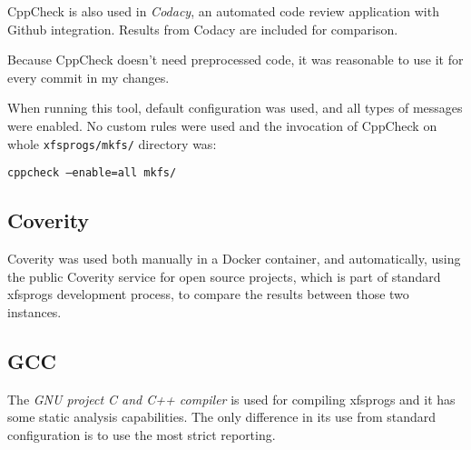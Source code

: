 CppCheck is also used in {\em Codacy}, an automated code review application
with Github integration. Results from Codacy are included for comparison.

Because CppCheck doesn't need preprocessed code, it was reasonable to use
it for every commit in my changes.

When running this tool, default configuration was used, and all types of
messages were enabled. No custom rules were used and the invocation of
CppCheck on whole {\tt xfsprogs/mkfs/} directory was:

{\tt cppcheck --enable=all mkfs/}



\subsection{Coverity}
Coverity was used both manually in a Docker container, and automatically,
using the public Coverity service for open source projects, which is part
of standard xfsprogs development process, to compare the results between
those two instances.

\subsection{GCC}
The {\em GNU project C and C++ compiler} is used for compiling xfsprogs and
it has some static analysis capabilities. The only difference in its use
from standard configuration is to use the most strict reporting.

